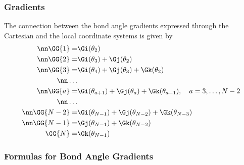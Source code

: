 \subsubsection{Gradients}

The connection between the 
bond angle gradients expressed through the Cartesian and the local 
coordinate systems is given by
\begin{align}
  \nn\GG{1}=&\Gi(\theta_2)\\
  \nn\GG{2}=&\Gi(\theta_3)+\Gj(\theta_2)\\
  \nn\GG{3}=&\Gi(\theta_4)+\Gj(\theta_3)+\Gk(\theta_2)\\
  \nn\ldots\\
  \nn\GG{a}=&\Gi(\theta_{a+1})+\Gj(\theta_a)+\Gk(\theta_{a-1}),\quad a=3,\ldots,N-2\\
  \nn\ldots\\
  \nn\GG{N-2}=&\Gi(\theta_{N-1})+\Gj(\theta_{N-2})+\Gk(\theta_{N-3})\\
  \nn\GG{N-1}=&\Gj(\theta_{N-1})+\Gk(\theta_{N-2})\\
  \GG{N}=&\Gk(\theta_{N-1})
\end{align}

\subsubsection{Formulas for Bond Angle Gradients}


